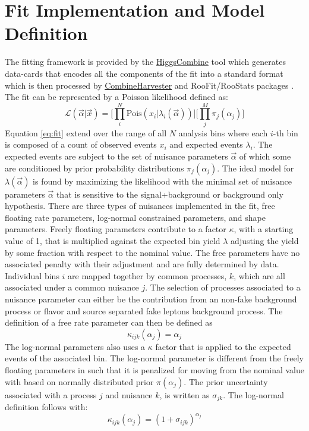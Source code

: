 \section{Fit Implementation and Model Definition}
The fitting framework is provided by the \url{HiggsCombine} tool which generates data-cards that encodes all the components of the fit into a standard format which is then processed by \url{CombineHarvester} and RooFit/RooStats packages \cite{Antcheva:2009zz}\cite{moneta2011roostats}. The fit can be represented by a Poisson likelihood defined as:
\begin{equation}
\label{eq:fit}
\mathcal{L}(\vec{\alpha}|\vec{x}) = \bigg[ \prod_i^N \text{Pois}(x_i|\lambda_i(\vec{\alpha})) \bigg] \bigg[\prod_j^M \pi_j(\alpha_j) \bigg]
\end{equation}
Equation \ref{eq:fit} extend over the range of all $N$ analysis bins where each $i$-th bin is composed of a count of observed events $x_i$ and expected events $\lambda_i$. The expected events are subject to the set of nuisance parameters $\vec{\alpha}$ of which some are conditioned by prior probability distributions $\pi_j(\alpha_j)$. The ideal model for $\lambda(\vec{\alpha})$ is found by maximizing the likelihood with the minimal set of nuisance parameters $\vec{\alpha}$ that is sensitive to the signal+background or background only hypothesis.  There are three types of nuisances implemented in the fit, free floating rate parameters, log-normal constrained parameters, and shape parameters.  Freely floating parameters contribute to a factor $\kappa$, with a starting value of 1, that is multiplied against the expected bin yield $\lambda$ adjusting the yield by some fraction with respect to the nominal value. The free parameters have no associated penalty with their adjustment and are fully determined by data. Individual bins $i$ are mapped together by common processes, $k$, which are all associated under a common nuisance $j$. The selection of processes associated to a nuisance parameter can either be the contribution from an non-fake background process or flavor and source separated fake leptons background process. The definition of a free rate parameter can then be defined as 
\begin{equation}
\label{eq:rateparam}
\kappa_{ijk}(\alpha_j) = \alpha_j
\end{equation}  
The log-normal parameters also uses a $\kappa$ factor that is applied to the expected events of the associated bin. The log-normal parameter is different from the freely floating parameters in such that it is penalized for moving from the nominal value with based on normally distributed prior $\pi(\alpha_j)$. The prior uncertainty associated with a process $j$ and nuisance $k$, is written as $\sigma_{jk}$. The log-normal definition follows with:
\begin{equation}
\label{eq:logparam}
\kappa_{ijk}(\alpha_j) = (1+\sigma_{ijk})^{\alpha_j}
\end{equation}

